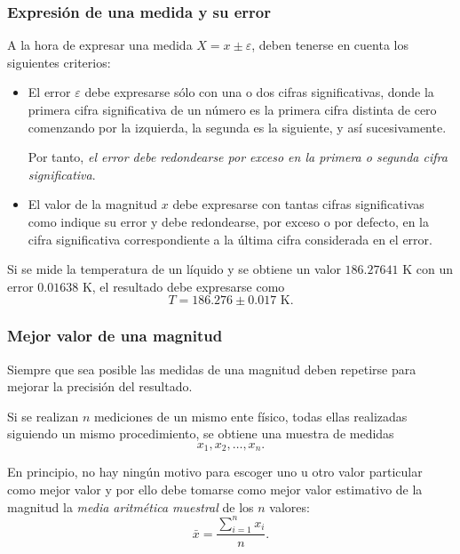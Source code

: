 \begin{frame}
	\frametitle{Expresión de una medida y su error}
	A la hora de expresar una medida $X=x\pm \varepsilon$, deben tenerse en cuenta los siguientes criterios:
	\begin{itemize}
		\item El error $\varepsilon$ debe expresarse sólo con una o dos cifras significativas, donde la primera cifra
		      significativa de un número es la primera cifra distinta de cero comenzando por la izquierda, la segunda es la
		      siguiente, y así sucesivamente.
		      
		      Por tanto, \emph{el error debe redondearse por exceso en la primera o segunda cifra significativa}. 
		      
		\item El valor de la magnitud $x$ debe expresarse con tantas cifras significativas como indique su error y debe
		      redondearse, por exceso o por defecto, en la cifra significativa correspondiente a la última cifra considerada en el
		      error. 
	\end{itemize}
	
	 Si se mide la temperatura de un líquido y se obtiene un valor $186.27641$ K con un error
	$0.01638$ K, el resultado debe expresarse como
	\[
		T=186.276\pm 0.017 \mbox{ K}.
	\]
\end{frame}


\begin{frame}
	\frametitle{Mejor valor de una magnitud}
	Siempre que sea posible las medidas de una magnitud deben repetirse para mejorar la precisión del resultado.
	
	Si se realizan $n$ mediciones de un mismo ente físico, todas ellas realizadas siguiendo un mismo procedimiento, se
	obtiene una muestra de medidas 
	\[
		x_1,x_2,\ldots, x_n.
	\]
	
	En principio, no hay ningún motivo para escoger uno u otro valor particular como mejor valor y por ello debe tomarse
	como mejor valor estimativo de la magnitud la \emph{media aritmética muestral} de los $n$ valores:
	\[
		\bar x = \frac{\sum_{i=1}^n x_i}{n}.
	\] 
\end{frame}



